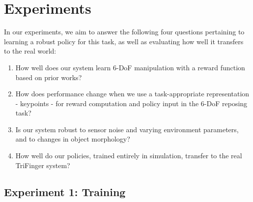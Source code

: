 \documentclass[letterpaper, 10 pt, conference]{ieeeconf}  %
\begin{document}
\vspace{-5pt}
\section{Experiments}
\label{sec:experiments}
\vspace{-5pt}


In our experiments, we aim to answer the following four questions pertaining to learning a robust policy for this task, as well as evaluating how well it transfers to the real world:
\begin{enumerate}[noitemsep, wide, labelwidth=!, labelindent=0pt]
    \item How well does our system learn 6-DoF manipulation with a reward function based on prior works?
    \item How does performance change when we use a task-appropriate representation - keypoints - for reward computation and policy input in the 6-DoF reposing task?
    \item Is our system robust to sensor noise and varying environment parameters, and to changes in object morphology?
    \item How well do our policies, trained entirely in simulation, transfer to the real TriFinger system?
\end{enumerate}




\vspace{-5pt}
\subsection{Experiment 1: Training}
\label{sec:initialtrainingexp}
\end{document}
